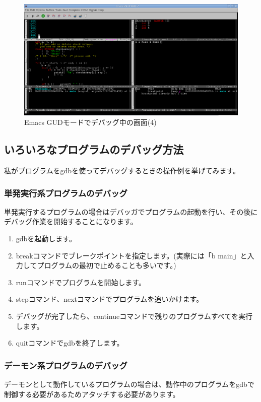 \documentclass[mingoth,a4paper]{jsarticle}
\begin{document}
\begin{figure}[H]
\begin{center}
\includegraphics[scale=0.5]{image200910/gdb-emacs-gud4.png}
\caption{Emacs GUDモードでデバッグ中の画面(4)}\label{figure-emacs-debugging2}
\end{center}
\end{figure}


\subsection{いろいろなプログラムのデバッグ方法}
私がプログラムをgdbを使ってデバッグするときの操作例を挙げてみます。

\subsubsection{単発実行系プログラムのデバッグ}
単発実行するプログラムの場合はデバッガでプログラムの起動を行い、その後にデバッグ作業を開始することになります。

\begin{enumerate}
\item gdbを起動します。
\item breakコマンドでブレークポイントを指定します。(実際には「b main」と入力してプログラムの最初で止めることも多いです。)
\item runコマンドでプログラムを開始します。
\item stepコマンド、nextコマンドでプログラムを追いかけます。
\item デバッグが完了したら、continueコマンドで残りのプログラムすべてを実行します。
\item quitコマンドでgdbを終了します。
\end{enumerate}

\subsubsection{デーモン系プログラムのデバッグ}
デーモンとして動作しているプログラムの場合は、動作中のプログラムをgdbで制御する必要があるためアタッチする必要があります。
\end{document}
